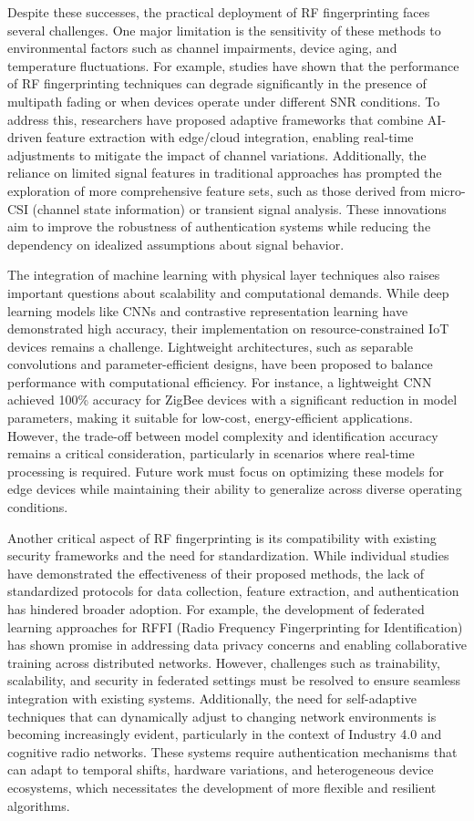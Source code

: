 \documentclass[conference]{IEEEtran}
\begin{document}
Despite these successes, the practical deployment of RF fingerprinting faces several challenges. One major limitation is the sensitivity of these methods to environmental factors such as channel impairments, device aging, and temperature fluctuations. For example, studies have shown that the performance of RF fingerprinting techniques can degrade significantly in the presence of multipath fading or when devices operate under different SNR conditions. To address this, researchers have proposed adaptive frameworks that combine AI-driven feature extraction with edge/cloud integration, enabling real-time adjustments to mitigate the impact of channel variations. Additionally, the reliance on limited signal features in traditional approaches has prompted the exploration of more comprehensive feature sets, such as those derived from micro-CSI (channel state information) or transient signal analysis. These innovations aim to improve the robustness of authentication systems while reducing the dependency on idealized assumptions about signal behavior.  

The integration of machine learning with physical layer techniques also raises important questions about scalability and computational demands. While deep learning models like CNNs and contrastive representation learning have demonstrated high accuracy, their implementation on resource-constrained IoT devices remains a challenge. Lightweight architectures, such as separable convolutions and parameter-efficient designs, have been proposed to balance performance with computational efficiency. For instance, a lightweight CNN achieved 100\% accuracy for ZigBee devices with a significant reduction in model parameters, making it suitable for low-cost, energy-efficient applications. However, the trade-off between model complexity and identification accuracy remains a critical consideration, particularly in scenarios where real-time processing is required. Future work must focus on optimizing these models for edge devices while maintaining their ability to generalize across diverse operating conditions.  

Another critical aspect of RF fingerprinting is its compatibility with existing security frameworks and the need for standardization. While individual studies have demonstrated the effectiveness of their proposed methods, the lack of standardized protocols for data collection, feature extraction, and authentication has hindered broader adoption. For example, the development of federated learning approaches for RFFI (Radio Frequency Fingerprinting for Identification) has shown promise in addressing data privacy concerns and enabling collaborative training across distributed networks. However, challenges such as trainability, scalability, and security in federated settings must be resolved to ensure seamless integration with existing systems. Additionally, the need for self-adaptive techniques that can dynamically adjust to changing network environments is becoming increasingly evident, particularly in the context of Industry 4.0 and cognitive radio networks. These systems require authentication mechanisms that can adapt to temporal shifts, hardware variations, and heterogeneous device ecosystems, which necessitates the development of more flexible and resilient algorithms.  
\end{document}
